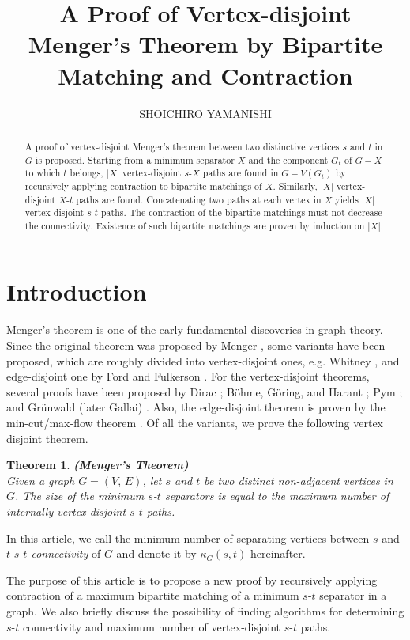 \documentclass{article}
\title{A Proof of Vertex-disjoint Menger's Theorem by Bipartite Matching and Contraction}
\author{SHOICHIRO YAMANISHI}
\newtheorem{theorem}{Theorem}
\begin{document}
\maketitle

\begin{abstract}
A proof of vertex-disjoint Menger's theorem between two distinctive vertices $s$ and $t$ in $G$ is proposed.
Starting from a minimum separator $X$ and the component $G_t$ of $G - X$ to which $t$ belongs, $|X|$ vertex-disjoint
$s$-$X$ paths are found in $G - V(G_t)$ by recursively applying contraction to bipartite matchings of $X$.
Similarly, $|X|$ vertex-disjoint $X$-$t$ paths are found. Concatenating two paths at each vertex in $X$ yields
$|X|$ vertex-disjoint $s$-$t$ paths. The contraction of the bipartite matchings must not decrease the connectivity.
Existence of such bipartite matchings are proven by induction on $|X|$. 
\end{abstract}



\section{Introduction}
Menger's theorem is one of the early fundamental discoveries in graph theory.
Since the original theorem was proposed by Menger \cite{menger1}, some variants have been proposed,
which are roughly divided into
vertex-disjoint ones, e.g. Whitney \cite{whitney1},  and edge-disjoint one by Ford and Fulkerson \cite{fordfulkerson1}.
For the vertex-disjoint theorems, several proofs have been proposed
by Dirac \cite{dirac1}; B\"{o}hme, G\"{o}ring, and Harant \cite{bohmegoringharant1};
Pym \cite{pym1}; and Gr\"{u}nwald (later Gallai) \cite{grunwald1}.
Also, the edge-disjoint theorem is proven by the min-cut/max-flow theorem \cite{fordfulkerson1}.
Of all the variants, we prove the following vertex disjoint theorem.
\begin{theorem}\label{theorem1}
{\bf (Menger's Theorem)}\\Given a graph $G=(V,\,E)$, let $s$ and $t$ be two
distinct non-adjacent vertices in $G$. The size of the minimum $s$-$t$ separators
is equal to the maximum number of internally vertex-disjoint $s$-$t$ paths.
\end{theorem}
In this article, we call the minimum number of separating vertices between $s$ and $t$ {\it $s$-$t$ connectivity} of $G$
and denote it by $\kappa_G(s, t)$ hereinafter.

The purpose of this article is to propose a new proof by recursively applying contraction of
a maximum bipartite matching of a minimum $s$-$t$ separator in a graph.
We also briefly discuss the possibility of finding algorithms for determining $s$-$t$ connectivity
and maximum number of vertex-disjoint $s$-$t$ paths.
\end{document}
